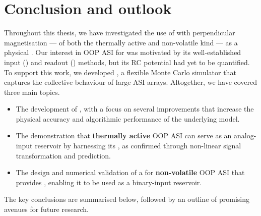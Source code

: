 \chapter{Conclusion and outlook}\label{ch:Conclusion}

Throughout this thesis, we have investigated the use of  with perpendicular magnetisation --- of both the thermally active and non-volatile kind --- as a physical .
Our interest in OOP ASI for  was motivated by its well-established input () and readout () methods, but its RC potential had yet to be quantified.
To support this work, we developed \hotspice, a flexible Monte Carlo simulator that captures the collective behaviour of large ASI arrays.
Altogether, we have covered three main topics.
\begin{itemize}[itemsep=-3pt]
	\item The development of \textbf{\hotspice}, with a focus on several improvements that increase the physical accuracy and algorithmic performance of the underlying model.
	\item The demonstration that \textbf{thermally active} OOP ASI can serve as an analog-input reservoir by harnessing its , as confirmed through non-linear signal transformation and prediction.
	\item The design and numerical validation of a  for \textbf{non-volatile} OOP ASI that provides , enabling it to be used as a binary-input reservoir.
\end{itemize}
The key conclusions are summarised below, followed by an outline of promising avenues for future research.

